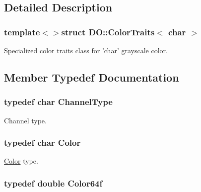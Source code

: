 \subsection{Detailed Description}
\subsubsection*{template$<$$>$struct D\-O\-::\-Color\-Traits$<$ char $>$}

Specialized color traits class for 'char' grayscale color. 

\subsection{Member Typedef Documentation}
\hypertarget{struct_d_o_1_1_color_traits_3_01char_01_4_a068771d43562e39b0f446c960a439e81}{
\subsubsection[{Channel\-Type}]{\setlength{\rightskip}{0pt plus 5cm}typedef char {\bf Channel\-Type}}}\label{struct_d_o_1_1_color_traits_3_01char_01_4_a068771d43562e39b0f446c960a439e81}
Channel type. \hypertarget{struct_d_o_1_1_color_traits_3_01char_01_4_a5e11ed2b5bbfd2ec0290ba691e77315c}{
\subsubsection[{Color}]{\setlength{\rightskip}{0pt plus 5cm}typedef char {\bf Color}}}\label{struct_d_o_1_1_color_traits_3_01char_01_4_a5e11ed2b5bbfd2ec0290ba691e77315c}
\hyperlink{class_d_o_1_1_color}{Color} type. \hypertarget{struct_d_o_1_1_color_traits_3_01char_01_4_a9a301fd8ba0a7225e38351d3e5b2e4d3}{
\subsubsection[{Color64f}]{\setlength{\rightskip}{0pt plus 5cm}typedef double {\bf Color64f}}}\label{struct_d_o_1_1_color_traits_3_01char_01_4_a9a301fd8ba0a7225e38351d3e5b2e4d3}
